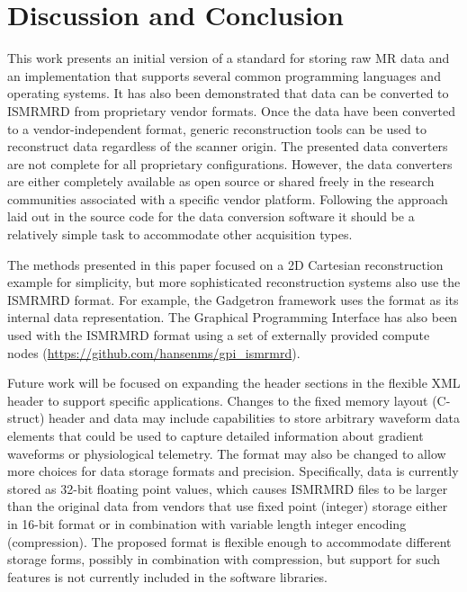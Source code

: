 \documentclass[12pt, draft]{article}
\begin{document}
\section*{Discussion and Conclusion}
This work presents an initial version of a standard for storing raw MR data and an implementation that supports several common programming languages and operating systems. It has also been demonstrated that data can be converted to ISMRMRD from proprietary vendor formats. Once the data have been converted to a vendor-independent format, generic reconstruction tools can be used to reconstruct data regardless of the scanner origin. The presented data converters are not complete for all proprietary configurations. However, the data converters are either completely available as open source or shared freely in the research communities associated with a specific vendor platform. Following the approach laid out in the source code for the data conversion software it should be a relatively simple task to accommodate other acquisition types. 

The methods presented in this paper focused on a 2D Cartesian reconstruction example for simplicity, but more sophisticated reconstruction systems also use the ISMRMRD format. For example, the Gadgetron \cite{Hansen:2013aa} framework uses the format as its internal data representation. The Graphical Programming Interface \cite{Zwart:2014aa} has also been used with the ISMRMRD format using a set of externally provided compute nodes (\url{https://github.com/hansenms/gpi_ismrmrd}).

Future work will be focused on expanding the header sections in the flexible XML header to support specific applications. Changes to the fixed memory layout (C-struct) header and data may include capabilities to store arbitrary waveform data elements that could be used to capture detailed information about gradient waveforms or physiological telemetry. The format may also be changed to allow more choices for data storage formats and precision. Specifically, data is currently stored as 32-bit floating point values, which causes ISMRMRD files to be larger than the original data from vendors that use fixed point (integer) storage either in 16-bit format or in combination with variable length integer encoding (compression). The proposed format is flexible enough to accommodate different storage forms, possibly in combination with compression, but support for such features is not currently included in the software libraries.  
\end{document}
